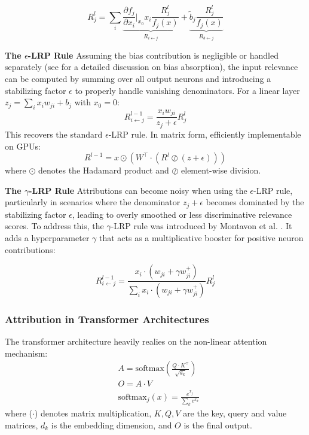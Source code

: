\documentclass{article}
\begin{document}
\begin{equation*}
     R_j^l = \sum_i \underbrace{\frac{\partial f_j}{\partial x_i}\Big|_{x_0} x_i \frac{R_j^l}{f_j(x)}}_{R_{i\leftarrow j}} + \underbrace{\tilde{b}_j \frac{R_j^l}{f_j(x)}}_{R_{b\leftarrow j}}
\end{equation*}

\textbf{The $\epsilon$-LRP Rule}
Assuming the bias contribution is negligible or handled separately (see \cite{achtibat2024attnlrp} for a detailed discussion on bias absorption), the input relevance can be computed by summing over all output neurons and introducing a stabilizing factor $\epsilon$ to properly handle vanishing denominators. For a linear layer $z_j = \sum_i x_i w_{ji} + b_j$ with $x_0 = 0$:
\begin{equation}
    R_{i \leftarrow j}^{l - 1} = \frac{x_i w_{ji}}{z_j + \epsilon} R_j^l
    \label{eq:assignment}
\end{equation}
This recovers the standard $\epsilon$-LRP rule. In matrix form, efficiently implementable on GPUs:
\begin{equation}
    R^{l-1} = x \odot (W^\top \cdot (R^l \oslash (z + \epsilon)))
\end{equation}
where $\odot$ denotes the Hadamard product and $\oslash$ element-wise division.

\textbf{The $\gamma$-LRP Rule}
Attributions can become noisy when using the $\epsilon$-LRP rule, particularly in scenarios where the denominator $z_j + \epsilon$ becomes dominated by the stabilizing factor $\epsilon$, leading to overly smoothed or less discriminative relevance scores. To address this, the $\gamma$-LRP rule was introduced by Montavon et al. \cite{montavon2019lrp}. 
It adds a hyperparameter $\gamma$ that acts as a multiplicative booster for positive neuron contributions:

\begin{equation}
  R_{i \leftarrow j}^{l - 1} = \frac{x_i \cdot (w_{ji} + \gamma w_{ji}^+)}{\sum_i x_i \cdot (w_{ji} + \gamma w_{ji}^+)} R_j^l
\end{equation}

\subsubsection{Attribution in Transformer Architectures}
The transformer architecture \cite{vaswani2017attention} heavily realies on the non-linear attention mechanism:
\begin{align}
   & A = \text{softmax}\left(\frac{Q \cdot K^\top}{\sqrt{d_k}}\right) \\
   & O = A \cdot V \label{eq:attention}\\
   & \text{softmax}_j(x) = \frac{e^{x_j}}{\sum_k e^{x_k}} 
\end{align}
where ($\cdot$) denotes matrix multiplication, $K, Q, V$ are the key, query and value matrices, $d_k$ is the embedding dimension, and $O$ is the final output.
\end{document}
